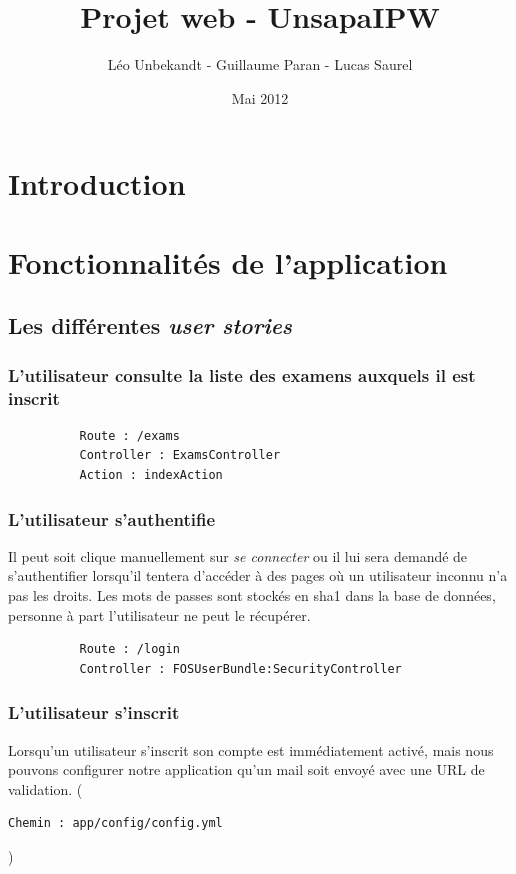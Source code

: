 \documentclass{report}
\author{Léo Unbekandt - Guillaume Paran - Lucas Saurel}
\date{Mai 2012}
\title{Projet web - UnsapaIPW}
\begin{document}
  \maketitle
  \clearpage
  \tableofcontents
  \clearpage

  \section*{Introduction}

  \section{Fonctionnalités de l'application}
    \subsection{Les différentes \textsl{user stories}}
      \subsubsection{L'utilisateur consulte la liste des examens auxquels il est inscrit}
        \begin{verbatim}
          Route : /exams 
          Controller : ExamsController
          Action : indexAction
        \end{verbatim}
      \subsubsection{L'utilisateur s'authentifie}
        Il peut soit clique manuellement sur \textsl{se connecter} ou il lui sera demandé
        de s'authentifier lorsqu'il tentera d'accéder à des pages où un utilisateur inconnu
        n'a pas les droits. Les mots de passes sont stockés en sha1 dans la base de données,
        personne à part l'utilisateur ne peut le récupérer.

        \begin{verbatim}
          Route : /login 
          Controller : FOSUserBundle:SecurityController
        \end{verbatim}
      \subsubsection{L'utilisateur s'inscrit}
        Lorsqu'un utilisateur s'inscrit son compte est immédiatement activé, mais nous
        pouvons configurer notre application qu'un mail soit envoyé avec une URL de
        validation. (\begin{verbatim}Chemin : app/config/config.yml\end{verbatim})
        
\end{document}
